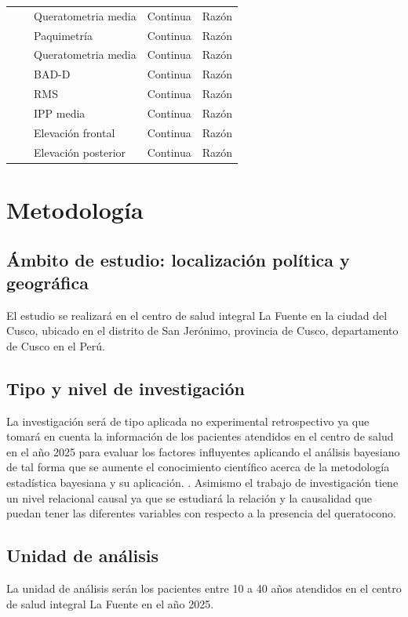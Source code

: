 \begin{landscape}
\begin{longtable}{p{4cm}p{6.5cm}p{5cm}p{3cm}p{2.5cm}}
    \cline{3-5}
    & & Queratometria media & Continua & Razón \\
    \cline{3-5}
    & & Paquimetría & Continua & Razón \\
    \cline{3-5}
    & & Queratometria media & Continua & Razón \\
    \cline{3-5}
    & & BAD-D & Continua & Razón \\
    \cline{3-5}
    & & RMS & Continua & Razón \\
    \cline{3-5}
    & & IPP media & Continua & Razón \\
    \cline{3-5}
    & & Elevación frontal & Continua & Razón \\
    \cline{3-5}
    & & Elevación posterior & Continua & Razón \\
    \hline
\end{longtable}

\end{landscape}

\section{Metodología}
\subsection{Ámbito de estudio: localización política y geográfica}
El estudio se realizará en el centro de salud integral La Fuente en la ciudad del Cusco, ubicado en el distrito de San Jerónimo, provincia de Cusco, departamento de Cusco en el Perú.

\subsection{Tipo y nivel de investigación}
La investigación será de tipo aplicada no experimental retrospectivo ya que tomará en cuenta la información de los pacientes atendidos en el centro de salud en el año 2025 para evaluar los factores influyentes aplicando el análisis bayesiano de tal forma que se aumente el conocimiento científico acerca de la metodología estadística bayesiana y su aplicación. \parencite{hernandez2004introduccion}.
Asimismo el trabajo de investigación tiene un nivel relacional causal ya que se estudiará la relación y la causalidad que puedan tener las diferentes variables con respecto a la presencia del queratocono.

\subsection{Unidad de análisis}
La unidad de análisis serán los pacientes entre 10 a 40 años atendidos en el centro de salud integral La Fuente en el año 2025.

